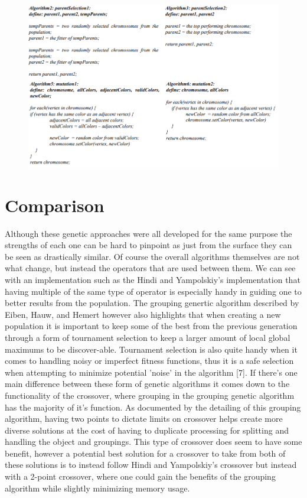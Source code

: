 \documentclass{article}
\begin{document}
\begin{figure}
    \centering
    \caption{}
    \includegraphics[scale=.5]{algo.png}
   \end{figure}
 \section{Comparison}
    \hspace{\parindent} Although these genetic approaches were all developed for the same purpose the strengths of each one can be hard to pinpoint as just from the surface they can be seen as drastically similar. Of course the overall algorithms themselves are not what change, but instead the operators that are used between them. We can see with an implementation such as the Hindi and Yampolskiy's implementation that having multiple of the same type of operator is especially handy in guiding one to better results from the population. The grouping genertic algorithm described by Eiben, Hauw, and Hemert however also highlights that when creating a new population it is important to keep some of the best from the previous generation through a form of tournament selection to keep a larger amount of local global maximums to be discover-able. Tournament selection is also quite handy when it comes to handling noisy or imperfect fitness functions, thus it is a safe selection when attempting to minimize potential 'noise' in the algorithm [7]. If there's one main difference between these form of genetic algorithms it comes down to the functionality of the crossover, where grouping in the grouping genetic algorithm has the majority of it's function. As documented by the detailing of this grouping algorithm, having two points to dictate limits on crossover helps create more diverse solutions at the cost of having to duplicate processing for splitting and handling the object and groupings. This type of crossover does seem to have some benefit, however a potential best solution for a crossover to take from both of these solutions is to instead follow Hindi and Yampolskiy's crossover but instead with a 2-point crossover, where one could gain the benefits of the grouping algorithm while slightly minimizing memory usage.
\end{document}
